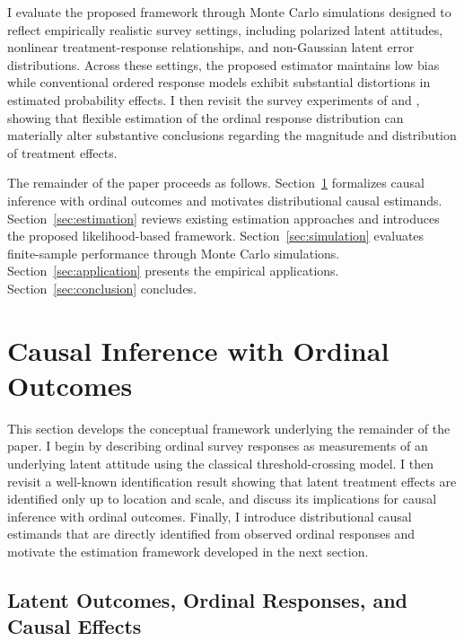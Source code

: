 \documentclass{article}
\begin{document}
I evaluate the proposed framework through Monte Carlo simulations designed to reflect empirically realistic survey settings, including polarized latent attitudes, nonlinear treatment-response relationships, and non-Gaussian latent error distributions. Across these settings, the proposed estimator maintains low bias while conventional ordered response models exhibit substantial distortions in estimated probability effects. I then revisit the survey experiments of \citet{Tomz2020a} and \citet{Mattingly2025a}, showing that flexible estimation of the ordinal response distribution can materially alter substantive conclusions regarding the magnitude and distribution of treatment effects.

The remainder of the paper proceeds as follows. Section~\ref{sec:causalordinal} formalizes causal inference with ordinal outcomes and motivates distributional causal estimands. Section~\ref{sec:estimation} reviews existing estimation approaches and introduces the proposed likelihood-based framework. Section~\ref{sec:simulation} evaluates finite-sample performance through Monte Carlo simulations. Section~\ref{sec:application} presents the empirical applications. Section~\ref{sec:conclusion} concludes.

\clearpage



\section{Causal Inference with Ordinal Outcomes}
\label{sec:causalordinal}

This section develops the conceptual framework underlying the remainder of the paper. I begin by describing ordinal survey responses as measurements of an underlying latent attitude using the classical threshold-crossing model. I then revisit a well-known identification result showing that latent treatment effects are identified only up to location and scale, and discuss its implications for causal inference with ordinal outcomes. Finally, I introduce distributional causal estimands that are directly identified from observed ordinal responses and motivate the estimation framework developed in the next section.

\subsection{Latent Outcomes, Ordinal Responses, and Causal Effects}
\label{subsec:setup}
\end{document}
